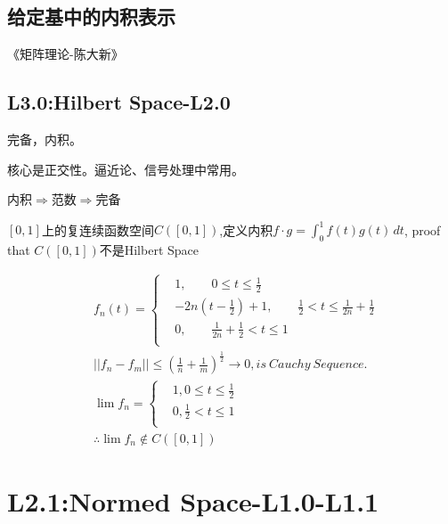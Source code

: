 \documentclass[UTF8]{../../09-Mathematics}
\begin{document}
\section{给定基中的内积表示}

《矩阵理论-陈大新》






\section{L3.0:Hilbert Space-L2.0}

完备，内积。

核心是正交性。逼近论、信号处理中常用。

内积$\Rightarrow$范数$\Rightarrow$完备


\begin{proposition}
  $[0,1]$上的复连续函数空间$ C([0, 1])$,定义内积$f \cdot g = \int_{0}^{1} f(t)g(t) \,dt $, proof that $ C([0, 1])$不是Hilbert Space

  \begin{equation}
    \begin{aligned}
    &f_n(t) =
    \begin{cases}
    &1,\qquad 0 \leqslant t \leqslant \frac{1}{2}\\
    &-2n(t- \frac{1}{2}) + 1,\qquad \frac{1}{2} < t \leqslant \frac{1}{2n} + \frac{1}{2}\\
    &0, \qquad \frac{1}{2n} + \frac{1}{2} < t \leqslant 1\\
    \end{cases}\\
    &|| f_n - f_m|| \leqslant (\frac{1}{n} + \frac{1}{m})^{\frac{1}{2}} \rightarrow 0, is \  Cauchy \  Sequence.\\
    & \lim f_n = 
    \begin{cases}
      &1,  0 \leqslant t \leqslant \frac{1}{2}\\
      &0,  \frac{1}{2} < t \leqslant 1\\
    \end{cases}\\
    & \therefore \lim f_n \notin C([0, 1])
    \end{aligned}
  \end{equation}

\end{proposition}


\chapter{L2.1:Normed Space-L1.0-L1.1}
\end{document}
